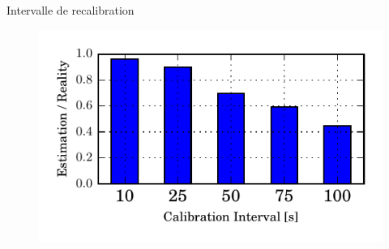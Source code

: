 \begin{frame}{Intervalle de recalibration}
  \begin{figure}[ht]
    \centering
    \includegraphics[width=\textwidth]{figures/ratio_recalibration.pdf}
  \end{figure}
\end{frame}







